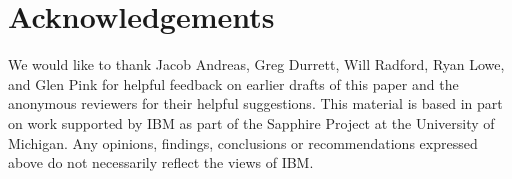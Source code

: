 \documentclass[11pt,a4paper]{article}
\begin{document}
\section*{Acknowledgements}
We would like to thank Jacob Andreas, Greg Durrett, Will Radford, Ryan Lowe, and Glen Pink for helpful feedback on earlier drafts of this paper and the anonymous reviewers for their helpful suggestions.
This material is based in part on work supported by IBM as part of the Sapphire Project at the University of Michigan.
Any opinions, findings, conclusions or recommendations expressed above do not necessarily reflect the views of IBM.



\end{document}
